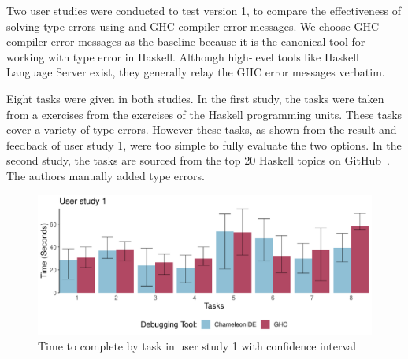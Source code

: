 Two user studies were conducted to test \chameleon{} version 1, to compare the effectiveness of solving type errors using \chameleon{} and GHC compiler error messages. We choose GHC compiler error messages as the baseline because it is the canonical tool for working with type error in Haskell. Although high-level tools like Haskell Language Server exist, they generally relay the GHC error messages verbatim. 


Eight tasks were given in both studies. In the first study, the tasks were taken from a exercises from the exercises of the Haskell programming units. These tasks cover a variety of type errors.  However these tasks, as shown from the result and feedback of user study 1, were too simple to fully evaluate the two options. In the second study, the tasks are sourced from the top 20 Haskell topics on GitHub~\cite{githubHaskell}. The authors manually added type errors. 





\begin{figure}[h]
    \centering
    \includegraphics[width=\linewidth]{images/r1-data.pdf}
    \caption{Time to complete by task in user study 1 with confidence interval}
    \label{fig:r1-analysis}
\end{figure}


